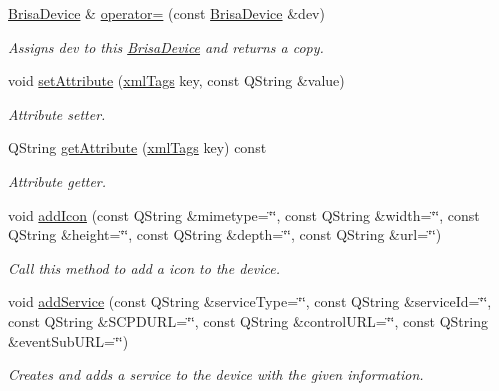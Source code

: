 \begin{DoxyCompactItemize}
\hyperlink{classBrisaUpnp_1_1BrisaDevice}{BrisaDevice} \& \hyperlink{classBrisaUpnp_1_1BrisaDevice_a6b9c7e0a436761e3911ab80523f45c29}{operator=} (const \hyperlink{classBrisaUpnp_1_1BrisaDevice}{BrisaDevice} \&dev)
\begin{DoxyCompactList}\small\item\em Assigns dev to this \hyperlink{classBrisaUpnp_1_1BrisaDevice}{BrisaDevice} and returns a copy. \item\end{DoxyCompactList}\item 
void \hyperlink{classBrisaUpnp_1_1BrisaDevice_a5343b4ea851ba1eb444742df5dc6d3af}{setAttribute} (\hyperlink{classBrisaUpnp_1_1BrisaDevice_a4c9c16e6c1aa08b4e9ca5b81a26abca1}{xmlTags} key, const QString \&value)
\begin{DoxyCompactList}\small\item\em Attribute setter. \item\end{DoxyCompactList}\item 
QString \hyperlink{classBrisaUpnp_1_1BrisaDevice_a7abbb69f5552c3fddcf1f31fd394696a}{getAttribute} (\hyperlink{classBrisaUpnp_1_1BrisaDevice_a4c9c16e6c1aa08b4e9ca5b81a26abca1}{xmlTags} key) const 
\begin{DoxyCompactList}\small\item\em Attribute getter. \item\end{DoxyCompactList}\item 
void \hyperlink{classBrisaUpnp_1_1BrisaDevice_af6a967427b45359a01efd6444f56f54f}{addIcon} (const QString \&mimetype=\char`\"{}\char`\"{}, const QString \&width=\char`\"{}\char`\"{}, const QString \&height=\char`\"{}\char`\"{}, const QString \&depth=\char`\"{}\char`\"{}, const QString \&url=\char`\"{}\char`\"{})
\begin{DoxyCompactList}\small\item\em Call this method to add a icon to the device. \item\end{DoxyCompactList}\item 
void \hyperlink{classBrisaUpnp_1_1BrisaDevice_a2a5879c40079f073fc08b06d99427dcd}{addService} (const QString \&serviceType=\char`\"{}\char`\"{}, const QString \&serviceId=\char`\"{}\char`\"{}, const QString \&SCPDURL=\char`\"{}\char`\"{}, const QString \&controlURL=\char`\"{}\char`\"{}, const QString \&eventSubURL=\char`\"{}\char`\"{})
\begin{DoxyCompactList}\small\item\em Creates and adds a service to the device with the given information. \item\end{DoxyCompactList}\item 

\end{DoxyCompactItemize}
